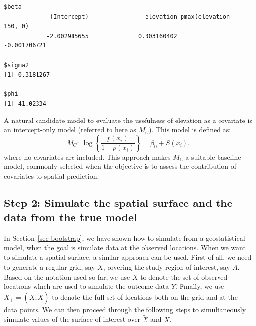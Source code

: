 \documentclass[
  letterpaper,
]{krantz}
\begin{document}
\begin{verbatim}
$beta
             (Intercept)                elevation pmax(elevation - 150, 0) 
            -2.002985655              0.003160402             -0.001706721 

$sigma2
[1] 0.3181267

$phi
[1] 41.02334
\end{verbatim}

A natural candidate model to evaluate the usefulness of elevation as a
covariate is an intercept-only model (referred to here as \(M_C\)). This
model is defined as: \[M_{C}: \:
\log\left\{\frac{p(x_i)}{1-p(x_i)}\right\} = \beta_{0} + S(x_i).
\] where no covariates are included. This approach makes \(M_C\) a
suitable baseline model, commonly selected when the objective is to
assess the contribution of covariates to spatial prediction.

\subsection{Step 2: Simulate the spatial surface and the data from the
true
model}\label{step-2-simulate-the-spatial-surface-and-the-data-from-the-true-model}

In Section~\ref{sec-bootstrap}, we have shown how to simulate from a
geostatistical model, when the goal is simulate data at the observed
locations. When we want to simulate a spatial surface, a similar
approach can be used. First of all, we need to generate a regular grid,
say \(\tilde{X}\), covering the study region of interest, say \(A\).
Based on the notation used so far, we use \(X\) to denote the set of
observed locations which are used to simulate the outcome data \(Y\).
Finally, we use \(X_{+} = (X, \tilde{X})\) to denote the full set of
locations both on the grid and at the data points. We can then proceed
through the following steps to simultaneously simulate values of the
surface of interest over \(\tilde{X}\) and \(X\).
\end{document}
